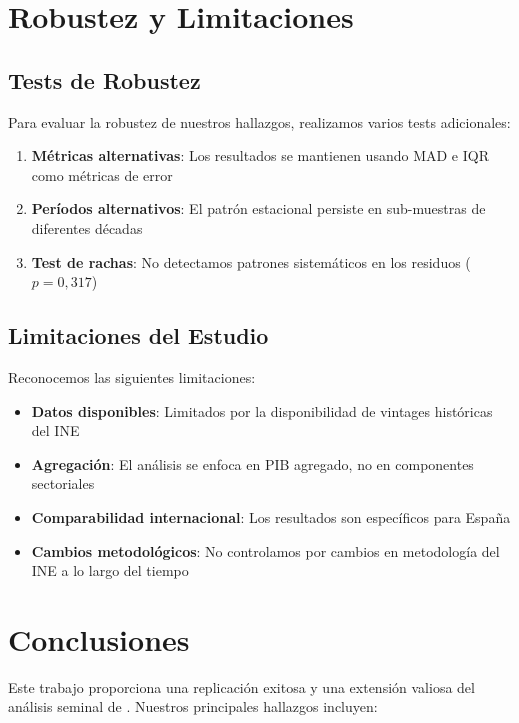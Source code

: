 \documentclass[12pt,a4paper]{article}
\begin{document}
\section{Robustez y Limitaciones}

\subsection{Tests de Robustez}

Para evaluar la robustez de nuestros hallazgos, realizamos varios tests adicionales:

\begin{enumerate}
\item \textbf{Métricas alternativas}: Los resultados se mantienen usando MAD e IQR como métricas de error
\item \textbf{Períodos alternativos}: El patrón estacional persiste en sub-muestras de diferentes décadas  
\item \textbf{Test de rachas}: No detectamos patrones sistemáticos en los residuos ($p = 0,317$)
\end{enumerate}

\subsection{Limitaciones del Estudio}

Reconocemos las siguientes limitaciones:

\begin{itemize}
\item \textbf{Datos disponibles}: Limitados por la disponibilidad de vintages históricas del INE
\item \textbf{Agregación}: El análisis se enfoca en PIB agregado, no en componentes sectoriales
\item \textbf{Comparabilidad internacional}: Los resultados son específicos para España
\item \textbf{Cambios metodológicos}: No controlamos por cambios en metodología del INE a lo largo del tiempo
\end{itemize}

\section{Conclusiones}

Este trabajo proporciona una replicación exitosa y una extensión valiosa del análisis seminal de \citet{pavia2017}. Nuestros principales hallazgos incluyen:
\end{document}
